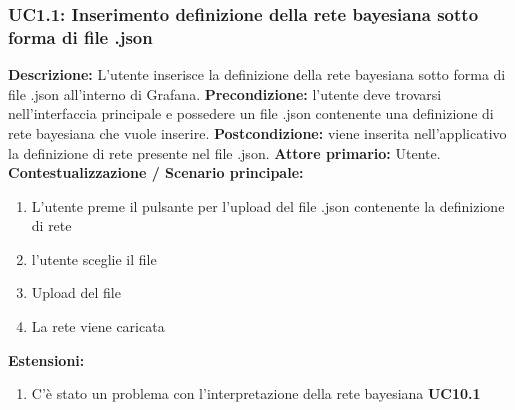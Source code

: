                 \subsubsection{UC1.1: Inserimento definizione della rete bayesiana sotto forma di file .json}
                    \textbf{Descrizione:} L'utente inserisce la definizione della rete bayesiana sotto forma di file .json all'interno di Grafana.
                    \newline
                    \textbf{Precondizione:}  l’utente deve trovarsi nell’interfaccia principale e possedere un file .json contenente una definizione di rete bayesiana che vuole inserire.
                    \newline
                    \textbf{Postcondizione:} viene inserita nell’applicativo la definizione di rete presente nel file .json.
                    \newline
                    \textbf{Attore primario:} Utente.
                    \newline
                    \textbf{Contestualizzazione / Scenario principale:} \begin{enumerate}
                        \item L’utente preme il pulsante per l’upload del file .json contenente la definizione di rete
                        \item l’utente sceglie il file
                        \item Upload del file
                        \item La rete viene caricata
                    \end{enumerate}
                    
                    \textbf{Estensioni:} \begin{enumerate}
                            \item C’è stato un problema con l’interpretazione della rete bayesiana \textbf{UC10.1}
                        \end{enumerate}
                        
